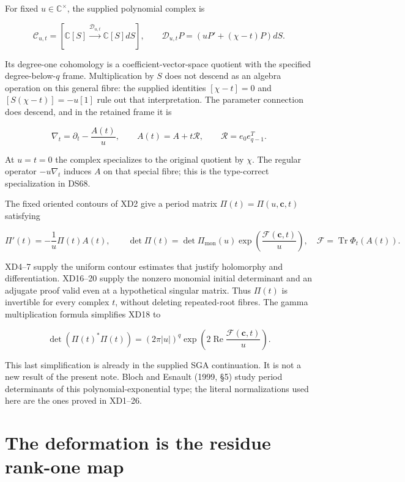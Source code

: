 \documentclass[
  11pt,
]{article}
\begin{document}
For fixed \(u\in\mathbb C^\times\), the supplied polynomial complex is

\[
\mathcal C_{u,t}=
[\mathbb C[S]\xrightarrow{\mathcal D_{u,t}}\mathbb C[S]dS],
\qquad \mathcal D_{u,t}P=(uP'+(\chi-t)P)dS.
\tag{RC3}
\]

Its degree-one cohomology is a coefficient-vector-space quotient with
the specified degree-below-\(q\) frame. Multiplication by \(S\) does not
descend as an algebra operation on this general fibre: the supplied
identities \([\chi-t]=0\) and \([S(\chi-t)]=-u[1]\) rule out that
interpretation. The parameter connection does descend, and in the
retained frame it is

\[
\nabla_t=\partial_t-\frac{A(t)}u,\qquad
A(t)=A+t\mathcal R,\qquad
\mathcal R=e_0e_{q-1}^{T}.
\tag{RC4}
\]

At \(u=t=0\) the complex specializes to the original quotient by
\(\chi\). The regular operator \(-u\nabla_t\) induces \(A\) on that
special fibre; this is the type-correct specialization in DS68.

The fixed oriented contours of XD2 give a period matrix
\(\Pi(t)=\Pi(u,\mathbf c,t)\) satisfying

\[
\Pi'(t)=-\frac1u\Pi(t)A(t),\qquad
\det\Pi(t)=\det\Pi_{\mathrm{mon}}(u)
\exp\left(\frac{\mathcal F(\mathbf c,t)}u\right),
\quad \mathcal F=\operatorname{Tr}\Phi_t(A(t)).
\tag{RC5}
\]

XD4--7 supply the uniform contour estimates that justify holomorphy and
differentiation. XD16--20 supply the nonzero monomial initial
determinant and an adjugate proof valid even at a hypothetical singular
matrix. Thus \(\Pi(t)\) is invertible for every complex \(t\), without
deleting repeated-root fibres. The gamma multiplication formula
simplifies XD18 to

\[
\det(\Pi(t)^*\Pi(t))=(2\pi|u|)^q
\exp\left(2\operatorname{Re}\frac{\mathcal F(\mathbf c,t)}u\right).
\tag{RC6}
\]

This last simplification is already in the supplied SGA continuation. It
is not a new result of the present note. Bloch and Esnault (1999, §5)
study period determinants of this polynomial-exponential type; the
literal normalizations used here are the ones proved in XD1--26.

\section{The deformation is the residue rank-one
map}\label{the-deformation-is-the-residue-rank-one-map}
\end{document}
